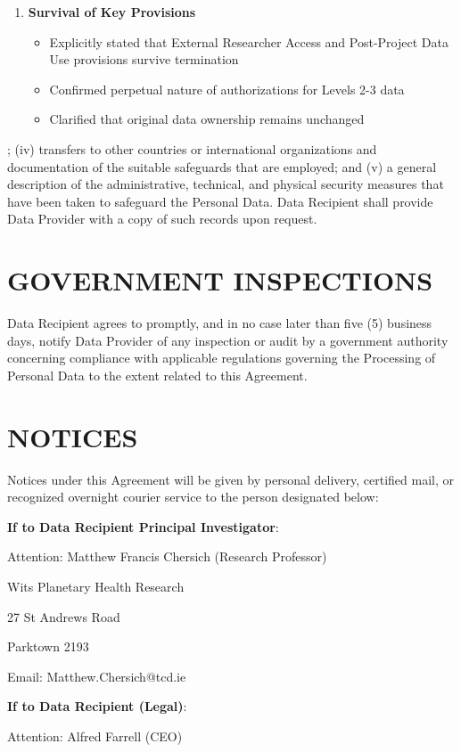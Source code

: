 \begin{enumerate}
\item \textbf{Survival of Key Provisions}
   \begin{itemize}
   \item Explicitly stated that External Researcher Access and Post-Project Data Use provisions survive termination
   \item Confirmed perpetual nature of authorizations for Levels 2-3 data
   \item Clarified that original data ownership remains unchanged
   \end{itemize}
\end{enumerate}

; (iv) transfers to other countries or international organizations and documentation of the suitable safeguards that are employed; and (v) a general description of the administrative, technical, and physical security measures that have been taken to safeguard the Personal Data. Data Recipient shall provide Data Provider with a copy of such records upon request.

\section{GOVERNMENT INSPECTIONS}

Data Recipient agrees to promptly, and in no case later than five (5) business days, notify Data Provider of any inspection or audit by a government authority concerning compliance with applicable regulations governing the Processing of Personal Data to the extent related to this Agreement.

\section{NOTICES}

Notices under this Agreement will be given by personal delivery, certified mail, or recognized overnight courier service to the person designated below:

\textbf{If to Data Recipient Principal Investigator}:

Attention: Matthew Francis Chersich (Research Professor)

Wits Planetary Health Research

27 St Andrews Road

Parktown 2193

Email: Matthew.Chersich@tcd.ie

\textbf{If to Data Recipient (Legal)}:

Attention: Alfred Farrell (CEO)

